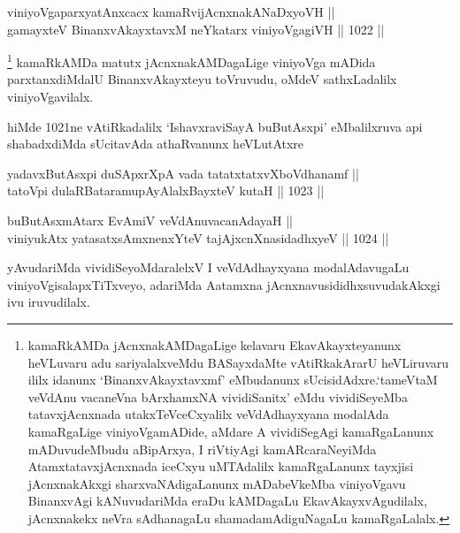 
\begin{shl}
viniyoVgaparxyatAnxcacx kamaRvijAcnxnakANaDxyoVH || \\
gamayxteV BinanxvAkayxtavxM neYkatarx viniyoVgagiVH \hfill || 1022 ||  
\end{shl}

\begin{artha}
\footnote{kamaRkAMDa jAcnxnakAMDagaLige kelavaru EkavAkayxteyanunx heVLuvaru adu sariyalalxveMdu BASayxdaMte vAtiRkakArarU heVLiruvaru ililx idanunx `BinanxvAkayxtavxmf' eMbudanunx sUcisidAdxre.`tameVtaM veVdAnu vacaneVna bArxhamxNA vividiSanitx' eMdu vividiSeyeMba tatavxjAcnxnada utakxTeVceCxyalilx veVdAdhayxyana modalAda kamaRgaLige viniyoVgamADide, aMdare A vividiSegAgi kamaRgaLanunx mADuvudeMbudu aBipArxya, I riVtiyAgi kamARcaraNeyiMda AtamxtatavxjAcnxnada iceCxyu uMTAdalilx kamaRgaLanunx tayxjisi jAcnxnakAkxgi sharxvaNAdigaLanunx mADabeVkeMba viniyoVgavu BinanxvAgi kANuvudariMda eraDu kAMDagaLu EkavAkayxvAgudilalx, jAcnxnakekx neVra sAdhanagaLu shamadamAdiguNagaLu kamaRgaLalalx.} kamaRkAMDa matutx jAcnxnakAMDagaLige viniyoVga mADida parxtanxdiMdalU BinanxvAkayxteyu toVruvudu, oMdeV sathxLadalilx viniyoVgavilalx.
\end{artha}

\begin{artha}
hiMde 1021ne vAtiRkadalilx `IshavxraviSayA buButAsxpi' eMbalilxruva api shabadxdiMda sUcitavAda athaRvanunx heVLutAtxre\ndash 
\end{artha}

\begin{shl}
yadavxButAsx\s pi duSApxrXpA vada tatatxtatxvXboVdhanamf || \\
tatoV\s pi dulaRBataramupAyAlalxBayxteV kutaH \hfill || 1023 ||  
\end{shl}

\vskip 2cm

\begin{shl}
buButAsxmAtarx EvAmiV veVdAnuvacanAdayaH || \\
viniyukAtx yatasatxsAmxnenxYteV tajAjxcnXnasidadhxyeV \hfill || 1024 ||  
\end{shl}

\begin{artha}
yAvudariMda vividiSeyoMdaralelxV I veVdAdhayxyana modalAdavugaLu viniyoVgisalapxTiTxveyo, adariMda Aatamxna jAcnxnavusididhxsuvudakAkxgi ivu iruvudilalx.
\end{artha}


